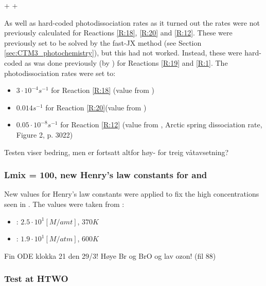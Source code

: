 \begin{reaction}
     +  \rightarrow {} + 
    \label{rqn:oh_hbr}
\end{reaction}

As well as hard-coded photodissociation rates as it turned out the rates were not previously calculated for Reactions \ref{R:18}, \ref{R:20} and \ref{R:12}. These were previously set to be solved by the fast-JX method (see Section \ref{sec:CTM3_photochemistry}), but this had not worked. Instead, these were hard-coded as was done previously (by \cite{Susanne}) for Reactions \ref{R:19} and \ref{R:1}. The photodissociation rates were set to: 

\begin{itemize}
    \item $3\cdot10^{-4} s^{-1}$ for Reaction \ref{R:18} (value from \cite{CAO})
    \item $0.014 s^{-1}$ for Reaction \ref{R:20}(value from \cite{CAO})
    \item $0.05\cdot10^{-8} s^{-1}$ for Reaction \ref{R:12} (value from \cite{Papanastasiou2013}, Arctic spring dissociation rate, Figure 2, p. 3022)
\end{itemize}


Testen viser bedring, men  er fortsatt altfor høy- for treig våtavsetning? 

\subsubsection{Lmix = 100, new Henry's law constants for  and }\label{sec:new_henrys_law}

New values for Henry's law constants were applied to fix the high concentrations seen in . The values were taken from \cite{dean1999}:

\begin{itemize}
    \item {}: $2.5 \cdot 10^{1} [M/amt]$, $370 K$
    \item {}: $1.9\cdot10^1 [M/atm]$, $600 K$ 
\end{itemize}

Fin ODE klokka 21 den 29/3! Høye Br og BrO og lav ozon! (fil 88) 


\subsubsection{Test at HTWO}

